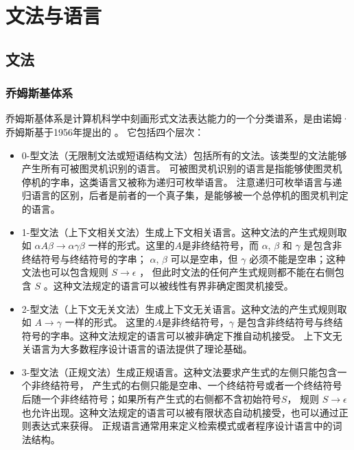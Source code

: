 \chapter{文法与语言}
\section{文法}
\subsection{乔姆斯基体系}
乔姆斯基体系是计算机科学中刻画形式文法表达能力的一个分类谱系，是由诺姆·乔姆斯基于1956年提出的
\cite{DBLP:journals/tit/Chomsky56}。
它包括四个层次：
\begin{itemize}
        \item 0-型文法（无限制文法或短语结构文法）包括所有的文法。该类型的文法能够产生所有可被图灵机识别的语言。
                可被图灵机识别的语言是指能够使图灵机停机的字串，这类语言又被称为递归可枚举语言。
                注意递归可枚举语言与递归语言的区别，后者是前者的一个真子集，是能够被一个总停机的图灵机判定的语言。

        \item 1-型文法（上下文相关文法）生成上下文相关语言。这种文法的产生式规则取如 $ \alpha A \beta \rightarrow \alpha \gamma \beta $
                一样的形式。这里的$A$是非终结符号，而 $\alpha$, $\beta$ 和 $\gamma$ 是包含非终结符号与终结符号的字串；
                $\alpha$, $\beta$ 可以是空串，但 $\gamma$ 必须不能是空串；这种文法也可以包含规则 $S \rightarrow \epsilon$ ，
                但此时文法的任何产生式规则都不能在右侧包含 $S$ 。这种文法规定的语言可以被线性有界非确定图灵机接受。

        \item 2-型文法（上下文无关文法）生成上下文无关语言。这种文法的产生式规则取如 $A \rightarrow \gamma$ 一样的形式。
                这里的$A$是非终结符号，$\gamma$ 是包含非终结符号与终结符号的字串。这种文法规定的语言可以被非确定下推自动机接受。
                上下文无关语言为大多数程序设计语言的语法提供了理论基础。

        \item 3-型文法（正规文法）生成正规语言。这种文法要求产生式的左侧只能包含一个非终结符号，
                产生式的右侧只能是空串、一个终结符号或者一个终结符号后随一个非终结符号；如果所有产生式的右侧都不含初始符号$S$，
                规则 $ S \rightarrow \epsilon$ 也允许出现。这种文法规定的语言可以被有限状态自动机接受，也可以通过正则表达式来获得。
                正规语言通常用来定义检索模式或者程序设计语言中的词法结构。
\end{itemize}


